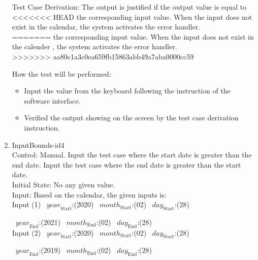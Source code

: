 \documentclass[12pt, titlepage]{article}
\begin{document}
\begin{enumerate}
 

Test Case Derivation: The output is justified if the output value is equal to
<<<<<<< HEAD
the corresponding input value. When the input does not exist in the calendar, the system activates the error handler. \\
=======
the corresponding input value. When the input does not exist in the calender
, the system activates the error handler. \\
>>>>>>> aa80c1a3c0ea659fb15863abb49a7aba0000cc59


How the test will be performed:
\begin{itemize} 
\item Input the value from the keyboard following the instruction of the
software interface. 
\item Verified the output showing on the screen by the test case derivation
 instruction. 
\end{itemize}

\item{InputBounds-id4\\}
Control: Manual. Input the test case where the start date is greater than the end date. Input the test case where the end date is greater than the start date.\\
 
Initial State: No any given value.\\
Input: Based on the calendar, the given inputs is:\\ 
Input (1)
~$\mathit{year}_\text{Start}$:(2020)
~$\mathit{month}_\text{Start}$:(02) ~$\mathit{day}_\text{Start}$:(28)

~$\mathit{year}_\text{End}$:(2021)
~$\mathit{month}_\text{End}$:(02) ~$\mathit{day}_\text{End}$:(28)\\

Input (2) ~$\mathit{year}_\text{Start}$:(2020)
~$\mathit{month}_\text{Start}$:(02) ~$\mathit{day}_\text{Start}$:(28)

~$\mathit{year}_\text{End}$:(2019)
~$\mathit{month}_\text{End}$:(02) ~$\mathit{day}_\text{End}$:(28)\\


\end{enumerate}
\end{document}
